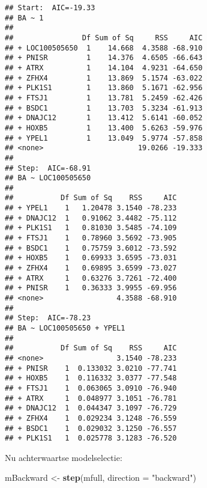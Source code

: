\documentclass[12pt,dutch,coursenotes]{book}
\newenvironment{Shaded}{\begin{snugshade}}{\end{snugshade}}
\newcommand{\KeywordTok}[1]{\textcolor[rgb]{0.13,0.29,0.53}{\textbf{#1}}}
\newcommand{\DataTypeTok}[1]{\textcolor[rgb]{0.13,0.29,0.53}{#1}}
\newcommand{\StringTok}[1]{\textcolor[rgb]{0.31,0.60,0.02}{#1}}
\newcommand{\NormalTok}[1]{#1}
\theoremstyle{definition}
\theoremstyle{definition}
\theoremstyle{definition}
\theoremstyle{remark}
\begin{document}
\begin{verbatim}
## Start:  AIC=-19.33
## BA ~ 1
## 
##                Df Sum of Sq     RSS     AIC
## + LOC100505650  1    14.668  4.3588 -68.910
## + PNISR         1    14.376  4.6505 -66.643
## + ATRX          1    14.104  4.9231 -64.650
## + ZFHX4         1    13.869  5.1574 -63.022
## + PLK1S1        1    13.860  5.1671 -62.956
## + FTSJ1         1    13.781  5.2459 -62.426
## + BSDC1         1    13.703  5.3234 -61.913
## + DNAJC12       1    13.412  5.6141 -60.052
## + HOXB5         1    13.400  5.6263 -59.976
## + YPEL1         1    13.049  5.9774 -57.858
## <none>                      19.0266 -19.333
## 
## Step:  AIC=-68.91
## BA ~ LOC100505650
## 
##           Df Sum of Sq    RSS     AIC
## + YPEL1    1   1.20478 3.1540 -78.233
## + DNAJC12  1   0.91062 3.4482 -75.112
## + PLK1S1   1   0.81030 3.5485 -74.109
## + FTSJ1    1   0.78960 3.5692 -73.905
## + BSDC1    1   0.75759 3.6012 -73.592
## + HOXB5    1   0.69933 3.6595 -73.031
## + ZFHX4    1   0.69895 3.6599 -73.027
## + ATRX     1   0.63276 3.7261 -72.400
## + PNISR    1   0.36333 3.9955 -69.956
## <none>                 4.3588 -68.910
## 
## Step:  AIC=-78.23
## BA ~ LOC100505650 + YPEL1
## 
##           Df Sum of Sq    RSS     AIC
## <none>                 3.1540 -78.233
## + PNISR    1  0.133032 3.0210 -77.741
## + HOXB5    1  0.116332 3.0377 -77.548
## + FTSJ1    1  0.063065 3.0910 -76.940
## + ATRX     1  0.048977 3.1051 -76.781
## + DNAJC12  1  0.044347 3.1097 -76.729
## + ZFHX4    1  0.029234 3.1248 -76.559
## + BSDC1    1  0.029032 3.1250 -76.557
## + PLK1S1   1  0.025778 3.1283 -76.520
\end{verbatim}

Nu achterwaartse modelselectie:

\begin{Shaded}
\begin{Highlighting}[]
\NormalTok{mBackward <-}\StringTok{ }\KeywordTok{step}\NormalTok{(mfull, }\DataTypeTok{direction =} \StringTok{"backward"}\NormalTok{)}
\end{Highlighting}
\end{Shaded}
\end{document}
